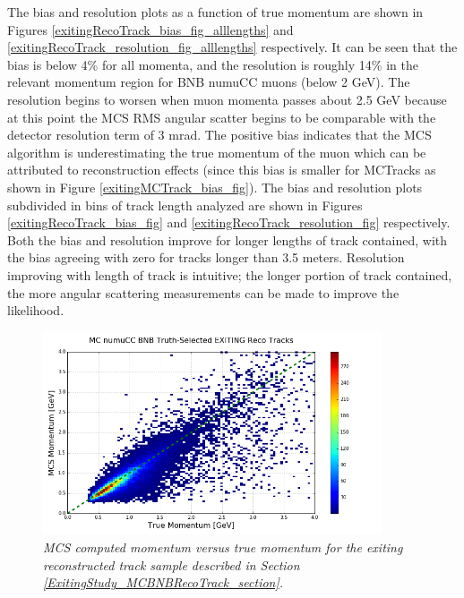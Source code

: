 The bias and resolution plots as a function of true momentum are shown in Figures \ref{exitingRecoTrack_bias_fig_alllengths} and \ref{exitingRecoTrack_resolution_fig_alllengths} respectively. It can be seen that the bias is below 4\% for all momenta, and the resolution is roughly 14\% in the relevant momentum region for BNB numuCC muons (below 2 GeV). The resolution begins to worsen when muon momenta passes about 2.5 GeV because at this point the MCS RMS angular scatter begins to be comparable with the detector resolution term of 3 mrad. The positive bias indicates that the MCS algorithm is underestimating the true momentum of the muon which can be attributed to reconstruction effects (since this bias is smaller for {\sc MCTracks} as shown in Figure \ref{exitingMCTrack_bias_fig}). The bias and resolution plots subdivided in bins of track length analyzed are shown in Figures \ref{exitingRecoTrack_bias_fig} and \ref{exitingRecoTrack_resolution_fig} respectively. Both the bias and resolution improve for longer lengths of track contained, with the bias agreeing with zero for tracks longer than 3.5 meters. Resolution improving with length of track is intuitive; the longer portion of track contained, the more angular scattering measurements can be made to improve the likelihood.\\


\begin{figure}[ht!]
\begin{center}
\includegraphics[width=100mm]{Figures/MCS_true_comparison_MCBNBRecoTrackExiting.png}
\end{center}
\caption{\textit{MCS computed momentum versus true momentum for the exiting reconstructed track sample described in Section \ref{ExitingStudy_MCBNBRecoTrack_section}.}}
\label{MCS_true_momentum_exiting_RecoTrack_fig}
\end{figure}


